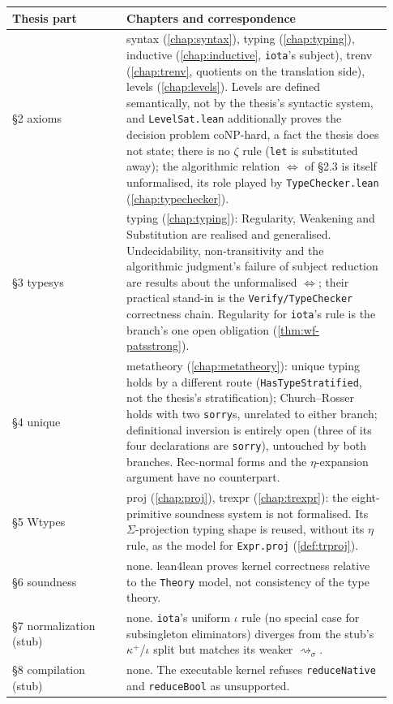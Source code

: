 \par\smallskip\noindent
\begin{tabular}{p{0.28\linewidth}p{0.65\linewidth}}
\toprule
Thesis part & Chapters and correspondence \\
\midrule
\S2 axioms & syntax (\ref{chap:syntax}), typing (\ref{chap:typing}), inductive
  (\ref{chap:inductive}, \texttt{iota}'s subject), trenv (\ref{chap:trenv}, quotients on the
  translation side), levels (\ref{chap:levels}). Levels are defined semantically, not by the
  thesis's syntactic system, and \texttt{LevelSat.lean} additionally proves the decision problem
  coNP-hard, a fact the thesis does not state; there is no $\zeta$ rule (\texttt{let} is substituted
  away); the algorithmic relation $\Leftrightarrow$ of \S2.3 is itself unformalised, its role
  played by \texttt{TypeChecker.lean} (\ref{chap:typechecker}). \\
\S3 typesys & typing (\ref{chap:typing}): Regularity, Weakening and Substitution are realised and
  generalised. Undecidability, non-transitivity and the algorithmic judgment's failure of subject
  reduction are results about the unformalised $\Leftrightarrow$; their practical stand-in is the
  \texttt{Verify/TypeChecker} correctness chain. Regularity for \texttt{iota}'s rule is the
  branch's one open obligation (\ref{thm:wf-patsstrong}). \\
\S4 unique & metatheory (\ref{chap:metatheory}): unique typing holds by a different route
  (\texttt{HasTypeStratified}, not the thesis's stratification); Church--Rosser holds with two
  \texttt{sorry}s, unrelated to either branch; definitional inversion is entirely open (three of
  its four declarations are \texttt{sorry}), untouched by both branches. Rec-normal forms and the
  $\eta$-expansion argument have no counterpart. \\
\S5 Wtypes & proj (\ref{chap:proj}), trexpr (\ref{chap:trexpr}): the eight-primitive soundness
  system is not formalised. Its $\Sigma$-projection typing shape is reused, without its $\eta$
  rule, as the model for \texttt{Expr.proj} (\ref{def:trproj}). \\
\S6 soundness & none. lean4lean proves kernel correctness relative to the \texttt{Theory} model,
  not consistency of the type theory. \\
\S7 normalization (stub) & none. \texttt{iota}'s uniform $\iota$ rule (no special case for
  subsingleton eliminators) diverges from the stub's $\kappa^+$/$\iota$ split but matches its
  weaker $\rightsquigarrow_\sigma$. \\
\S8 compilation (stub) & none. The executable kernel refuses \texttt{reduceNative} and
  \texttt{reduceBool} as unsupported. \\
\bottomrule
\end{tabular}\par\smallskip

